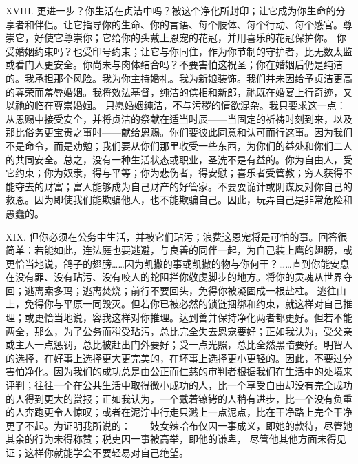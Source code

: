 XVIII. 更进一步？你生活在贞洁中吗？被这个净化所封印；让它成为你生命的分享者和伴侣。让它指导你的生命、你的言语、每个肢体、每个行动、每个感官。尊崇它，好使它尊崇你；它给你的头戴上恩宠的花冠，并用喜乐的花冠保护你。 你受婚姻约束吗？也受印号约束；让它与你同住，作为你节制的守护者，比无数太监或看门人更安全。你尚未与肉体结合吗？不要害怕这祝圣；你在婚姻后仍是纯洁的。我承担那个风险。我为你主持婚礼。我为新娘装饰。我们并未因给予贞洁更高的尊荣而羞辱婚姻。我将效法基督，纯洁的傧相和新郎，祂既在婚宴上行奇迹，又以祂的临在尊崇婚姻。 只愿婚姻纯洁，不与污秽的情欲混杂。我只要求这一点：从恩赐中接受安全，并将贞洁的祭献在适当时辰——当固定的祈祷时刻到来，以及那比俗务更宝贵之事时——献给恩赐。你们要彼此同意和认可而行这事。因为我们不是命令，而是劝勉；我们要从你们那里收受一些东西，为你们的益处和你们二人的共同安全。总之，没有一种生活状态或职业，圣洗不是有益的。你为自由人，受它约束；你为奴隶，得与平等；你为悲伤者，得安慰；喜乐者受管教；穷人获得不能夺去的财富；富人能够成为自己财产的好管家。不要耍诡计或阴谋反对你自己的救恩。因为即使我们能欺骗他人，也不能欺骗自己。因此，玩弄自己是非常危险和愚蠢的。\par

XIX. 但你必须在公务中生活，并被它们玷污；浪费这恩宠将是可怕的事。回答很简单：若能如此，连法庭也要逃避，与良善的同伴一起，为自己装上鹰的翅膀，或更恰当地说，鸽子的翅膀……因为凯撒的事或凯撒的物与你何干？……直到你能安息在没有罪、没有玷污、没有咬人的蛇阻拦你敬虔脚步的地方。将你的灵魂从世界夺回；逃离索多玛；逃离焚烧；前行不要回头，免得你被凝固成一根盐柱。 逃往山上，免得你与平原一同毁灭。但若你已被必然的锁链捆绑和约束，就这样对自己推理；或更恰当地说，容我这样对你推理。达到善并保持净化两者都更好。但若不能两全，那么，为了公务而稍受玷污，总比完全失去恩宠要好；正如我认为，受父亲或主人一点惩罚，总比被赶出门外要好；受一点光照，总比全然黑暗要好。明智人的选择，在好事上选择更大更完美的，在坏事上选择更小更轻的。因此，不要过分害怕净化。因为我们的成功总是由公正而仁慈的审判者根据我们在生活中的处境来评判；往往一个在公共生活中取得微小成功的人，比一个享受自由却没有完全成功的人得到更大的赏报；正如我认为，一个戴着镣铐的人稍有进步，比一个没有负重的人奔跑更令人惊叹；或者在泥泞中行走只溅上一点泥点，比在干净路上完全干净更了不起。为证明我所说的：——妓女辣哈布仅因一事成义，即她的款待，尽管她其余的行为未得称赞；税吏因一事被高举，即他的谦卑， 尽管他其他方面未得见证；这样你就能学会不要轻易对自己绝望。\par


